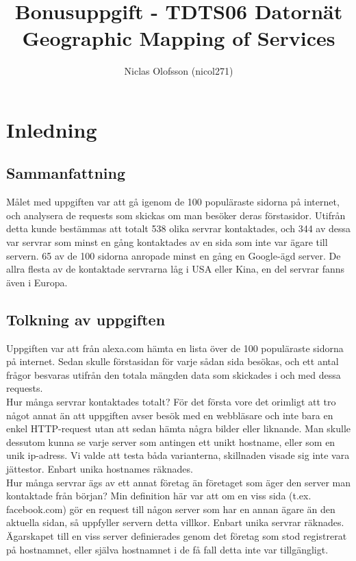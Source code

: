 \documentclass[a4paper]{article}
\title{
Bonusuppgift - TDTS06 Datornät\\
Geographic Mapping of Services\\
}
\author{
Niclas Olofsson (nicol271)\\
}
\begin{document}
\providecommand{\abs}[1]{\vert#1\vert}
\setlength{\parindent}{0pt}

\maketitle

\section{Inledning}
\subsection{Sammanfattning}
Målet med uppgiften var att gå igenom de 100 populäraste sidorna på internet, och analysera de requests som skickas om man besöker deras förstasidor. Utifrån detta kunde bestämmas att totalt 538 olika servrar kontaktades, och 344 av dessa var servrar som minst en gång kontaktades av en sida som inte var ägare till servern. 65 av de 100 sidorna anropade minst en gång en Google-ägd server. De allra flesta av de kontaktade servrarna låg i USA eller Kina, en del servrar fanns även i Europa.

\subsection{Tolkning av uppgiften}
Uppgiften var att från alexa.com hämta en lista över de 100 populäraste sidorna på internet. Sedan skulle förstasidan för varje sådan sida besökas, och ett antal frågor besvaras utifrån den totala mängden data som skickades i och med dessa requests.\\

Hur många servrar kontaktades totalt? För det första vore det orimligt att tro något annat än att uppgiften avser besök med en webbläsare och inte bara en enkel HTTP-request utan att sedan hämta några bilder eller liknande. Man skulle dessutom kunna se varje server som antingen ett unikt hostname, eller som en unik ip-adress. Vi valde att testa båda varianterna, skillnaden visade sig inte vara jättestor. Enbart unika hostnames räknades.\\

Hur många servrar ägs av ett annat företag än företaget som äger den server man kontaktade från början? Min definition här var att om en viss sida (t.ex. facebook.com) gör en request till någon server som har en annan ägare än den aktuella sidan, så uppfyller servern detta villkor. Enbart unika servrar räknades. Ägarskapet till en viss server definierades genom det företag som stod registrerat på hostnamnet, eller själva hostnamnet i de få fall detta inte var tillgängligt.\\
\end{document}
